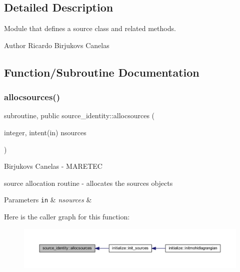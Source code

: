 \subsection{Detailed Description}
Module that defines a source class and related methods. 

\begin{DoxyAuthor}{Author}
Ricardo Birjukovs Canelas 
\end{DoxyAuthor}


\subsection{Function/\+Subroutine Documentation}
\mbox{\label{namespacesource__identity_a716b4cb4acec5756a6d4dcf20eee588e}} 
\subsubsection{\texorpdfstring{allocsources()}{allocsources()}}
{\footnotesize\ttfamily subroutine, public source\+\_\+identity\+::allocsources (\begin{DoxyParamCaption}\item[{integer, intent(in)}]{nsources }\end{DoxyParamCaption})}



Birjukovs Canelas -\/ M\+A\+R\+E\+T\+EC 

source allocation routine -\/ allocates the sources objects 
\begin{DoxyParams}[1]{Parameters}
\mbox{\tt in}  & {\em nsources} & \\
\hline
\end{DoxyParams}
Here is the caller graph for this function\+:
\nopagebreak
\begin{figure}[H]
\begin{center}
\leavevmode
\includegraphics[width=350pt]{namespacesource__identity_a716b4cb4acec5756a6d4dcf20eee588e_icgraph}
\end{center}
\end{figure}
\mbox{\label{namespacesource__identity_a8d7aaa58c575f6ed78f5ca29d64615d7}} 
